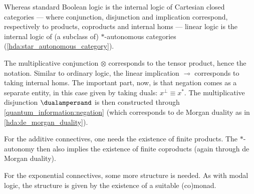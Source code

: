     \begin{property}
        Whereas standard Boolean logic is the internal logic of Cartesian closed categories --- where conjunction, disjunction and implication correspond, respectively to products, coproducts and internal homs --- linear logic is the internal logic of (a subclass of) $\ast$-autonomous categories (\cref{hda:star_autonomous_category}).

        The multiplicative conjunction $\otimes$ corresponds to the tensor product, hence the notation. Similar to ordinary logic, the linear implication $\multimap$ corresponds to taking internal homs. The important part, now, is that negation comes as a separate entity, in this case given by taking duals: $x^\perp\equiv x^*$. The multiplicative disjunction $\dualampersand$ is then constructed through \cref{quantum_information:negation} (which corresponds to de Morgan duality as in \cref{hda:de_morgan_duality}).

        For the additive connectives, one needs the existence of finite products. The $\ast$-autonomy then also implies the existence of finite coproducts (again through de Morgan duality).

        For the exponential connectives, some more structure is needed. As with modal logic, the structure is given by the existence of a suitable (co)monad.
    \end{property}